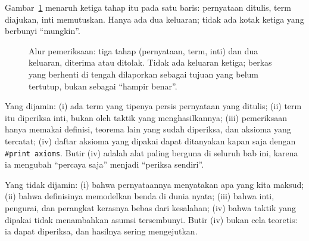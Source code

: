 Gambar~\ref{fig:alur-periksa} menaruh ketiga tahap itu pada satu baris: pernyataan ditulis, term
diajukan, inti memutuskan. Hanya ada dua keluaran; tidak ada kotak ketiga yang berbunyi ``mungkin''.

\begin{figure}[htbp]
\centering
{}
\caption{Alur pemeriksaan: tiga tahap (pernyataan, term, inti) dan dua keluaran, diterima atau
ditolak. Tidak ada keluaran ketiga; berkas yang berhenti di tengah dilaporkan sebagai tujuan yang
belum tertutup, bukan sebagai ``hampir benar''.}
\label{fig:alur-periksa}
\end{figure}

Yang dijamin: (i) ada term yang tipenya persis pernyataan yang ditulis; (ii) term itu diperiksa
inti, bukan oleh taktik yang menghasilkannya; (iii) pemeriksaan hanya memakai definisi, teorema
lain yang sudah diperiksa, dan aksioma yang tercatat; (iv) daftar aksioma yang dipakai dapat
ditanyakan kapan saja dengan \texttt{\#print axioms}. Butir (iv) adalah alat paling berguna di
seluruh bab ini, karena ia mengubah ``percaya saja'' menjadi ``periksa sendiri''.

Yang tidak dijamin: (i) bahwa pernyataannya menyatakan apa yang kita maksud; (ii) bahwa
definisinya memodelkan benda di dunia nyata; (iii) bahwa inti, pengurai, dan perangkat kerasnya
bebas dari kesalahan; (iv) bahwa taktik yang dipakai tidak menambahkan asumsi tersembunyi.
Butir (iv) bukan cela teoretis: ia dapat diperiksa, dan hasilnya sering mengejutkan.

